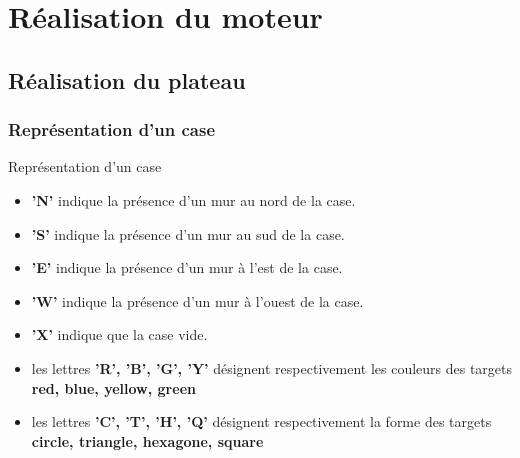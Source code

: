\documentclass{beamer}
\begin{document}
\section{Réalisation du moteur}
    \subsection{Réalisation du plateau}
        \subsubsection{Représentation d'un case}
            \begin{frame}{Représentation d'un case}
                \begin{itemize}
                    \item \textbf{'N'} indique la présence d'un mur au nord de la case.
                    \item \textbf{'S'} indique la présence d'un mur au sud de la case.
                    \item \textbf{'E'} indique la présence d'un mur à l'est de la case.
                    \item \textbf{'W'} indique la présence d'un mur à l'ouest de la case.
                    \item \textbf{'X'} indique que la case vide.
                    \item les lettres \textbf{'R', 'B', 'G', 'Y'} désignent respectivement les couleurs des targets \textbf{red, blue, yellow, green}
                    \item les lettres \textbf{'C', 'T', 'H', 'Q'} désignent respectivement la forme des targets \textbf{circle, triangle, hexagone, square} 
                \end{itemize}	
            \end{frame}
\end{document}
